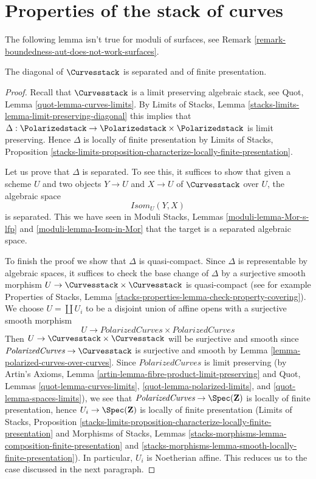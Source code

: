 \section{Properties of the stack of curves}
\label{section-properties}

\noindent
The following lemma isn't true for moduli of surfaces, see
Remark \ref{remark-boundedness-aut-does-not-work-surfaces}.

\begin{lemma}
\label{lemma-curves-diagonal-separated-fp}
The diagonal of $\Curvesstack$ is separated
and of finite presentation.
\end{lemma}

\begin{proof}
Recall that $\Curvesstack$ is a limit preserving algebraic stack, see
Quot, Lemma \ref{quot-lemma-curves-limits}.
By Limits of Stacks, Lemma \ref{stacks-limits-lemma-limit-preserving-diagonal}
this implies that
$\Delta : \Polarizedstack \to \Polarizedstack \times \Polarizedstack$
is limit preserving. Hence $\Delta$ is locally of finite presentation
by Limits of Stacks, Proposition
\ref{stacks-limits-proposition-characterize-locally-finite-presentation}.

\medskip\noindent
Let us prove that $\Delta$ is separated. To see this, it suffices to show
that given a scheme $U$ and two objects $Y \to U$ and $X \to U$ of
$\Curvesstack$ over $U$, the algebraic space
$$
\mathit{Isom}_U(Y, X)
$$
is separated. This we have seen in
Moduli Stacks, Lemmas \ref{moduli-lemma-Mor-s-lfp} and
\ref{moduli-lemma-Isom-in-Mor} that the target is
a separated algebraic space.

\medskip\noindent
To finish the proof we show that $\Delta$ is quasi-compact. Since
$\Delta$ is representable by algebraic spaces, it suffices to check
the base change of $\Delta$ by a surjective smooth morphism
$U \to \Curvesstack \times \Curvesstack$ is quasi-compact
(see for example Properties of Stacks, Lemma
\ref{stacks-properties-lemma-check-property-covering}).
We choose $U = \coprod U_i$ to be a disjoint union of affine opens
with a surjective smooth morphism
$$
U \longrightarrow
\textit{PolarizedCurves} \times \textit{PolarizedCurves}
$$
Then $U \to \Curvesstack \times \Curvesstack$ will be surjective
and smooth since $\textit{PolarizedCurves} \to \Curvesstack$
is surjective and smooth by Lemma \ref{lemma-polarized-curves-over-curves}.
Since $\textit{PolarizedCurves}$ is limit preserving
(by Artin's Axioms, Lemma \ref{artin-lemma-fibre-product-limit-preserving}
and Quot, Lemmas \ref{quot-lemma-curves-limits},
\ref{quot-lemma-polarized-limits}, and
\ref{quot-lemma-spaces-limits}), we
see that $\textit{PolarizedCurves} \to \Spec(\mathbf{Z})$ is locally of
finite presentation, hence $U_i \to \Spec(\mathbf{Z})$ is
locally of finite presentation
(Limits of Stacks, Proposition
\ref{stacks-limits-proposition-characterize-locally-finite-presentation}
and Morphisms of Stacks, Lemmas
\ref{stacks-morphisms-lemma-composition-finite-presentation} and
\ref{stacks-morphisms-lemma-smooth-locally-finite-presentation}).
In particular, $U_i$ is Noetherian affine. This reduces us to the
case discussed in the next paragraph.


\end{proof}
